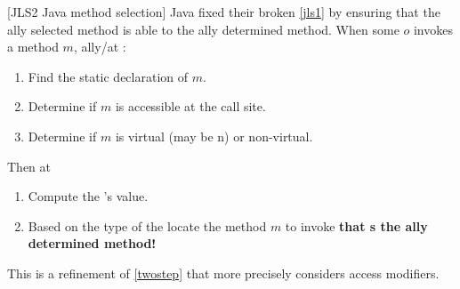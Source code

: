 \documentclass{article}
\begin{document}
\begin{definition}\label{jls2}[JLS2 Java method selection]
Java fixed their broken \ref{jls1} by ensuring that the \dynamic{}ally selected method is able to \override{} the \static{}ally determined method.
When some \receiver{} $o$ invokes a method $m$, \static{}ally/at \compiletime{}:
\begin{enumerate}
\item Find the static declaration of $m$.
\item Determine if $m$ is accessible at the call site.
\item Determine if $m$ is virtual (may be \override{}n) or non-virtual.
\end{enumerate}
Then at \runtime{}
\begin{enumerate}
\item Compute the \receiver{}'s value.
\item Based on the \dynamic{} type of the \receiver{} locate the method $m$ to invoke \textbf{that \override{}s the \static{}ally determined method!}
\end{enumerate}
This is a refinement of \ref{twostep} that more precisely considers access modifiers.
\end{definition}
\end{document}
